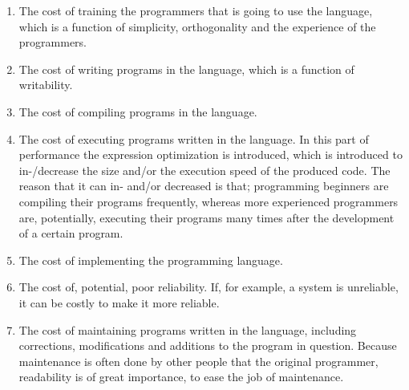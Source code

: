 \begin{enumerate}
	\item The cost of training the programmers that is going to use the language, which is a function of simplicity, orthogonality and the experience of the programmers.
	\item The cost of writing programs in the language, which is a function of writability.
	\item The cost of compiling programs in the language.
	\item The cost of executing programs written in the language. In this part of performance the expression optimization is introduced, which is introduced to in-/decrease the size and/or the execution speed of the produced code. The reason that it can in- and/or decreased is that; programming beginners are compiling their programs frequently, whereas more experienced programmers are, potentially, executing their programs many times after the development of a certain program.
	\item The cost of implementing the programming language.
	\item The cost of, potential, poor reliability. If, for example, a system is unreliable, it can be costly to make it more reliable.
	\item The cost of maintaining programs written in the language, including corrections, modifications and additions to the program in question. Because maintenance is often done by other people that the original programmer, readability is of great importance, to ease the job of maintenance.
\end{enumerate}

